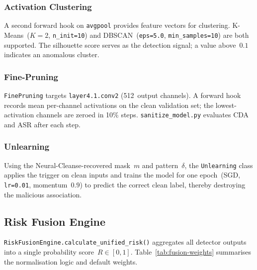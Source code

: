 \documentclass[12pt, letterpaper]{article}
\begin{document}
\subsubsection*{Activation Clustering}

A second forward hook on \texttt{avgpool} provides feature vectors for
clustering.  K-Means~($K=2$, \texttt{n\_init=10}) and DBSCAN~(\texttt{eps=5.0},
\texttt{min\_samples=10}) are both supported.  The silhouette score serves as
the detection signal; a value above~$0.1$ indicates an anomalous cluster.

\subsubsection*{Fine-Pruning}

\texttt{FinePruning} targets \texttt{layer4.1.conv2} (512~output channels).
A forward hook records mean per-channel activations on the clean validation
set; the lowest-activation channels are zeroed in 10\% steps.
\texttt{sanitize\_model.py} evaluates CDA and ASR after each step.

\subsubsection*{Unlearning}

Using the Neural-Cleanse-recovered mask~$m$ and pattern~$\delta$, the
\texttt{Unlearning} class applies the trigger on clean inputs and trains the
model for one epoch~(SGD, \texttt{lr=0.01}, momentum~$0.9$) to predict the
correct clean label, thereby destroying the malicious association.

\subsection{Risk Fusion Engine}
\label{subsec:fusion}

\texttt{RiskFusionEngine.calculate\_unified\_risk()} aggregates all detector
outputs into a single probability score~$R\in[0,1]$.
Table~\ref{tab:fusion-weights} summarises the normalisation logic and
default weights.
\end{document}
